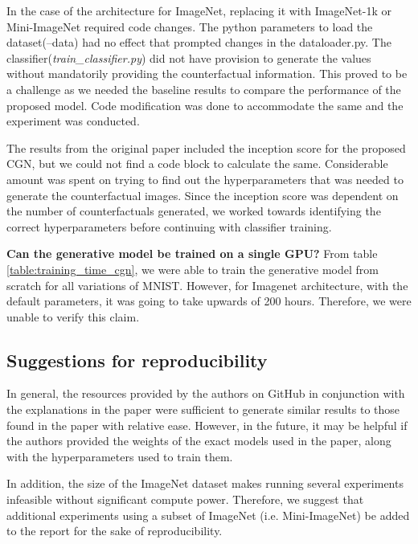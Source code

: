 In the case of the architecture for ImageNet, replacing it with ImageNet-1k or Mini-ImageNet required code changes. The python parameters to load the dataset(--data) had no effect that prompted changes in the dataloader.py.  
The classifier(\textit{train\_classifier.py}) did not have provision to generate the values without mandatorily providing the counterfactual information. This proved to be a challenge as we needed the baseline results to compare the performance of the proposed model. Code modification was done to accommodate the same and the experiment was conducted.

The results from the original paper included the inception score for the proposed CGN, but we could not find a code block to calculate the same. 
Considerable amount was spent on trying to find out the hyperparameters that was needed to generate the counterfactual images. Since the inception score was dependent on the number of counterfactuals generated, we worked towards identifying the correct hyperparameters before continuing with classifier training.

\textbf{Can the generative model be trained on a single GPU?} From table \ref{table:training_time_cgn}, we were able to train the generative model from scratch for all variations of MNIST. However, for Imagenet architecture, with the default parameters, it was going to take upwards of 200 hours. Therefore, we were unable to verify this claim.


\subsection{Suggestions for reproducibility}
In general, the resources provided by the authors on GitHub in conjunction with the explanations in the paper were sufficient to generate similar results to those found in the paper with relative ease. However, in the future, it may be helpful if the authors provided the weights of the exact models used in the paper, along with the hyperparameters used to train them.

In addition, the size of the ImageNet dataset makes running several experiments infeasible without significant compute power. Therefore, we suggest that additional experiments using a subset of ImageNet (i.e. Mini-ImageNet) be added to the report for the sake of reproducibility.


